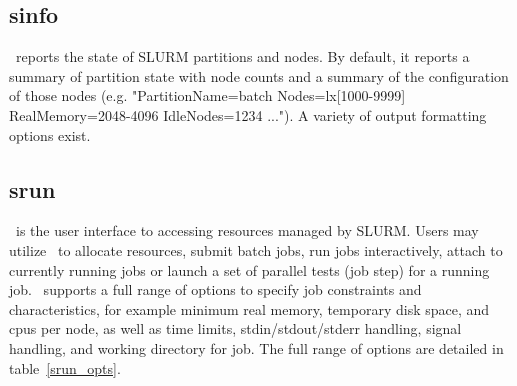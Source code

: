 \subsection{sinfo}

\sinfo\ reports the state of SLURM partitions and nodes.  By
default, it reports a summary of partition state with node counts and
a summary of the configuration of those nodes (e.g.  "PartitionName=batch
Nodes=lx[1000-9999] RealMemory=2048-4096 IdleNodes=1234 ..."). A variety 
of output formatting options exist.

\subsection{srun}

\srun\ is the user interface to accessing resources managed by SLURM.
Users may utilize \srun\ to allocate resources, submit batch jobs, 
run jobs interactively, attach to currently running jobs or launch 
a set of parallel tests (job step) for a running job. \srun\ 
supports a full range of options to specify job constraints and
characteristics, for example minimum real memory, temporary disk space,
and cpus per node, as well as time limits, stdin/stdout/stderr 
handling, signal handling, and working directory for job.
The full range of options are detailed in table~\ref{srun_opts}.

